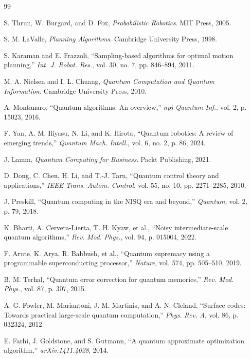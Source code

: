 \documentclass[conference]{IEEEtran}
\begin{document}
\begin{thebibliography}{99}

 S. Thrun, W. Burgard, and D. Fox, \textit{Probabilistic Robotics}. MIT Press, 2005.

 S. M. LaValle, \textit{Planning Algorithms}. Cambridge University Press, 1998.

 S. Karaman and E. Frazzoli, ``Sampling-based algorithms for optimal motion planning,'' \textit{Int. J. Robot. Res.}, vol. 30, no. 7, pp. 846--894, 2011.

 M. A. Nielsen and I. L. Chuang, \textit{Quantum Computation and Quantum Information}. Cambridge University Press, 2010.

 A. Montanaro, ``Quantum algorithms: An overview,'' \textit{npj Quantum Inf.}, vol. 2, p. 15023, 2016.

 F. Yan, A. M. Iliyasu, N. Li, and K. Hirota, ``Quantum robotics: A review of emerging trends,'' \textit{Quantum Mach. Intell.}, vol. 6, no. 2, p. 86, 2024.

 J. Lamm, \textit{Quantum Computing for Business}. Packt Publishing, 2021.

 D. Dong, C. Chen, H. Li, and T.-J. Tarn, ``Quantum control theory and applications,'' \textit{IEEE Trans. Autom. Control}, vol. 55, no. 10, pp. 2271--2285, 2010.

 J. Preskill, ``Quantum computing in the NISQ era and beyond,'' \textit{Quantum}, vol. 2, p. 79, 2018.

 K. Bharti, A. Cervera-Lierta, T. H. Kyaw, et al., ``Noisy intermediate-scale quantum algorithms,'' \textit{Rev. Mod. Phys.}, vol. 94, p. 015004, 2022.

 F. Arute, K. Arya, R. Babbush, et al., ``Quantum supremacy using a programmable superconducting processor,'' \textit{Nature}, vol. 574, pp. 505--510, 2019.

 B. M. Terhal, ``Quantum error correction for quantum memories,'' \textit{Rev. Mod. Phys.}, vol. 87, p. 307, 2015.

 A. G. Fowler, M. Mariantoni, J. M. Martinis, and A. N. Cleland, ``Surface codes: Towards practical large-scale quantum computation,'' \textit{Phys. Rev. A}, vol. 86, p. 032324, 2012.

 E. Farhi, J. Goldstone, and S. Gutmann, ``A quantum approximate optimization algorithm,'' \textit{arXiv:1411.4028}, 2014.


\end{thebibliography}
\end{document}
